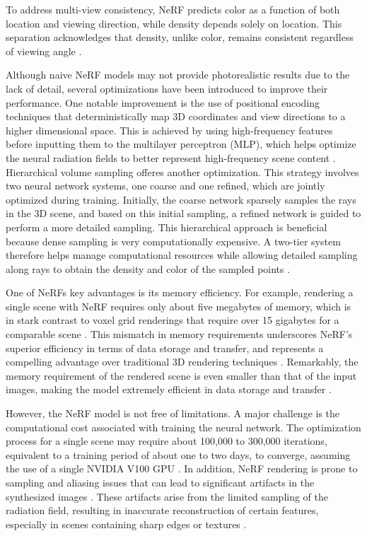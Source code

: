 To address multi-view consistency, NeRF predicts color as a function of both location and viewing direction, while density depends solely on location. This separation acknowledges that density, unlike color, remains consistent regardless of viewing angle \citep{hu2023consistentnerf}. 

Although naive NeRF models may not provide photorealistic results due to the lack of detail, several optimizations have been introduced to improve their performance. One notable improvement is the use of positional encoding techniques that deterministically map 3D coordinates and view directions to a higher dimensional space. This is achieved by using high-frequency features before inputting them to the multilayer perceptron (MLP), which helps optimize the neural radiation fields to better represent high-frequency scene content \citep{mildenhallNERF}. Hierarchical volume sampling offeres another optimization. This strategy involves two neural network systems, one coarse and one refined, which are jointly optimized during training. Initially, the coarse network sparsely samples the rays in the 3D scene, and based on this initial sampling, a refined network is guided to perform a more detailed sampling. This hierarchical approach is beneficial because dense sampling is very computationally expensive. A two-tier system therefore helps manage computational resources while allowing detailed sampling along rays to obtain the density and color of the sampled points \citep{arandjelović2021nerf}.

One of NeRFs key advantages is its memory efficiency. For example, rendering a single scene with NeRF requires only about five megabytes of memory, which is in stark contrast to voxel grid renderings that require over 15 gigabytes for a comparable scene \citep{mildenhallNERF}. This mismatch in memory requirements underscores NeRF's superior efficiency in terms of data storage and transfer, and represents a compelling advantage over traditional 3D rendering techniques \citep{mildenhallNERF}. Remarkably, the memory requirement of the rendered scene is even smaller than that of the input images, making the model extremely efficient in data storage and transfer \citep{mildenhallNERF}.

However, the NeRF model is not free of limitations. A major challenge is the computational cost associated with training the neural network. The optimization process for a single scene may require about 100,000 to 300,000 iterations, equivalent to a training period of about one to two days, to converge, assuming the use of a single NVIDIA V100 GPU \citep{mildenhallNERF}. In addition, NeRF rendering is prone to sampling and aliasing issues that can lead to significant artifacts in the synthesized images \citep{rabby2023beyondpixels}. These artifacts arise from the limited sampling of the radiation field, resulting in inaccurate reconstruction of certain features, especially in scenes containing sharp edges or textures \citep{rabby2023beyondpixels}.